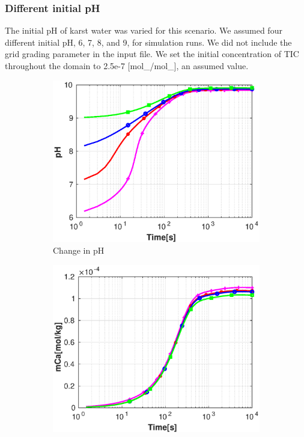 \subsubsection*{Different initial pH} \label{ssec:diffinitialpHnoflow}
The initial pH of karst water was varied for this scenario. We assumed four different initial pH, 6, 7, 8, and 9, 
for simulation runs. We did not include the grid grading parameter in the input file. We set the initial concentration of TIC throughout the domain to 
2.5e-7 [mol\_/mol\_], an assumed value.\\

\begin{figure}[!h]
        \centering
    \begin{subfigure}{.5\linewidth}
            \centering
        \includegraphics[width=\textwidth]{PICTURES/without_pH_pH.eps}
        \caption{Change in pH}
        \label{fig:withoutpHpH}
    \end{subfigure}%
        \hfill
    \begin{subfigure}{.5\linewidth}
            \centering
        \includegraphics[width=\textwidth]{PICTURES/without_pH_mCa.eps}

\end{subfigure}
\end{figure}

